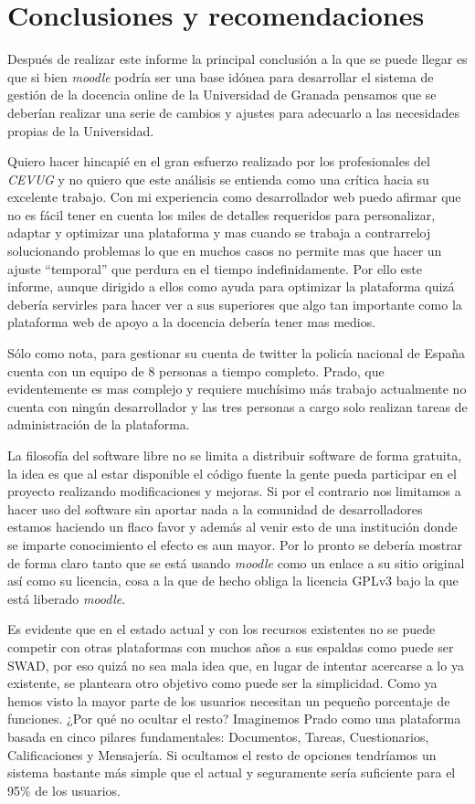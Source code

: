 \chapter{Conclusiones y recomendaciones}

Después de realizar este informe la principal conclusión a la que se puede llegar es que si bien \textit{moodle} podría ser una base idónea para desarrollar el sistema de gestión de la docencia online de la Universidad de Granada pensamos que se deberían realizar una serie de cambios y ajustes para adecuarlo a las necesidades propias de la Universidad.

\bigskip
Quiero hacer hincapié en el gran esfuerzo realizado por los profesionales del \textit{CEVUG} y no quiero que este análisis se entienda como una crítica hacia su excelente trabajo. Con mi experiencia como desarrollador web puedo afirmar que no es fácil tener en cuenta los miles de detalles requeridos para personalizar, adaptar y optimizar una plataforma y mas cuando se trabaja a contrarreloj solucionando problemas lo que en muchos casos no permite mas que hacer un ajuste ``temporal'' que perdura en el tiempo indefinidamente. Por ello este informe, aunque dirigido a ellos como ayuda para optimizar la plataforma quizá debería servirles para hacer ver a sus superiores que algo tan importante como la plataforma web de apoyo a la docencia debería tener mas medios.

\bigskip
Sólo como nota, para gestionar su cuenta de twitter la policía nacional de España cuenta con un equipo de 8 personas a tiempo completo. Prado, que evidentemente es mas complejo y requiere muchísimo más trabajo actualmente no cuenta con ningún desarrollador y las tres personas a cargo solo realizan tareas de administración de la plataforma.

\bigskip
La filosofía del software libre no se limita a distribuir software de forma gratuita, la idea es que al estar disponible el código fuente la gente pueda participar en el proyecto realizando modificaciones y mejoras. Si por el contrario nos limitamos a hacer uso del software sin aportar nada a la comunidad de desarrolladores estamos haciendo un flaco favor y además al venir esto de una institución donde se imparte conocimiento el efecto es aun mayor. Por lo pronto se debería mostrar de forma claro tanto que se está usando \textit{moodle} como un enlace a su sitio original así como su licencia, cosa a la que de hecho obliga la licencia GPLv3 bajo la que está liberado \textit{moodle}.

\bigskip
Es evidente que en el estado actual y con los recursos existentes no se puede competir con otras plataformas con muchos años a sus espaldas como puede ser SWAD, por eso quizá no sea mala idea que, en lugar de intentar acercarse a lo ya existente, se planteara otro objetivo como puede ser la simplicidad. Como ya hemos visto la mayor parte de los usuarios necesitan un pequeño porcentaje de funciones. ¿Por qué no ocultar el resto? Imaginemos Prado como una plataforma basada en cinco pilares fundamentales: Documentos, Tareas, Cuestionarios, Calificaciones y Mensajería. Si ocultamos el resto de opciones tendríamos un sistema bastante más simple que el actual y seguramente sería suficiente para el 95\% de los usuarios.

